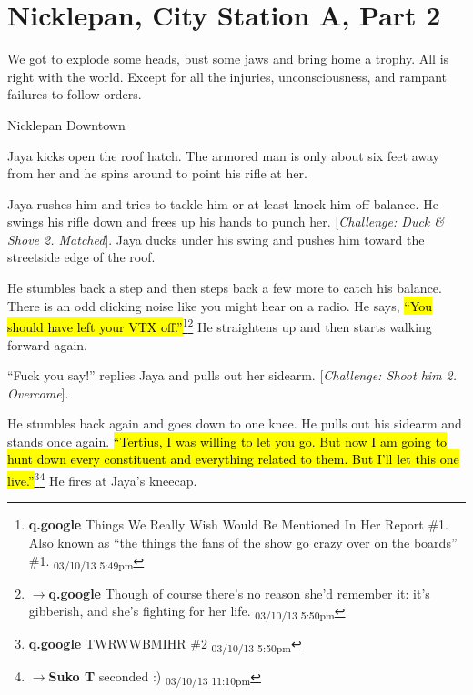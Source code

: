 \setcounter{chapter}{ 15 }
\chapter{\textbf{Nicklepan, City Station A, Part 2} }








We got to explode some heads, bust some jaws and bring home a trophy.  All is right with the world.  Except for all the injuries, unconsciousness, and rampant failures to follow orders.



\noindent\hrulefill





 {\LARGE Nicklepan Downtown } 



Jaya kicks open the roof hatch.  The armored man is only about six feet away from her and he spins around to point his rifle at her.



Jaya rushes him and tries to tackle him or at least knock him off balance.  He swings his rifle down and frees up his hands to punch her.  {[}\textit{Challenge: Duck \& Shove 2.  Matched}{]}. Jaya ducks under his swing and pushes him toward the streetside edge of the roof.



He stumbles back a step and then steps back a few more to catch his balance.  There is  an odd clicking noise like you might hear on a radio.  He says, \hl{``You should have left your VTX off.''}\footnote{\textbf{q.google }Things We Really Wish Would Be Mentioned In Her Report \#1.
Also known as ``the things the fans of the show go crazy over on the boards'' \#1. \textsubscript{03/10/13 5:49pm}}\footnote{$\rightarrow$\textbf{q.google }Though of course there's no reason she'd remember it: it's gibberish, and she's fighting for her life. \textsubscript{03/10/13 5:50pm}}  He straightens up and then starts walking forward again.



``Fuck you say!'' replies Jaya and pulls out her sidearm.  {[}\textit{Challenge: Shoot him 2.  Overcome}{]}.  



He stumbles back again and goes down to one knee.  He pulls out his sidearm and stands once again.  \hl{``Tertius, I was willing to let you go.  But now I am going to hunt down every constituent and everything related to them.  But I'll let this one live.''}\footnote{\textbf{q.google }TWRWWBMIHR \#2 \textsubscript{03/10/13 5:50pm}}\footnote{$\rightarrow$\textbf{Suko T }seconded :) \textsubscript{03/10/13 11:10pm}}  He fires at Jaya's kneecap.


